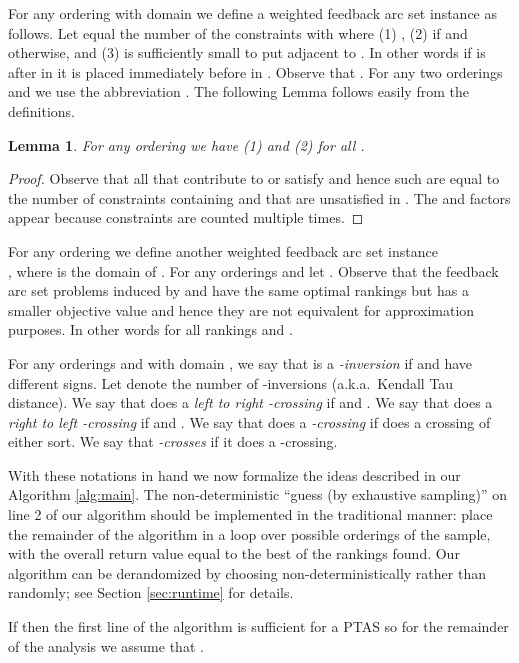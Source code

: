 \documentclass[dvips,11pt,letter]{article}
\newtheorem{lemma}[theorem]{Lemma}
\begin{document}
{For any ordering  with domain  we define a weighted feedback arc set instance  as follows. Let  equal the number of the constraints  with  where (1) , (2)  if  and  otherwise, and (3)  is sufficiently small to put  adjacent to . In other words if  is after  in  it is placed immediately before  in . Observe that . For any two orderings  and  we use the abbreviation .
The following Lemma follows easily from the definitions.

\begin{lemma}\label{lem:objEq}
For any ordering  we have (1)  and (2)  for all .
\end{lemma}

\begin{proof}
Observe that all  that contribute to  or  satisfy  and hence such  are equal to the number of constraints containing  and  that are unsatisfied in . The  and  factors appear because constraints are counted multiple times.
\end{proof}

For any ordering  we define another weighted feedback arc set instance \\
,
 where  is the domain of . For any orderings  and  let . Observe that the feedback arc set problems induced by  and  have the same optimal rankings but  has a smaller objective value and hence they are not equivalent for approximation purposes. In other words  for all rankings  and .

For any orderings  and  with domain , we say that  is a \emph{-inversion} if  and  have different signs. Let  denote the number of -inversions (a.k.a.\ Kendall Tau distance).
We say that  does a \emph{left to right -crossing} if  and . 
We say that  does a \emph{right to left -crossing} if  and . We say that  does a \emph{-crossing} if  does a crossing of either sort.
We say that  \emph{-crosses}  if it does a -crossing.

With these notations in hand we now formalize the ideas described in our Algorithm \ref{alg:main}. The non-deterministic ``guess (by exhaustive sampling)'' on line 2 of our algorithm should be implemented in the traditional manner: place the remainder of the algorithm in a loop over possible orderings of the sample, with the overall return value equal to the best of the  rankings found. Our algorithm can be derandomized by choosing   non-deterministically rather than randomly; see Section \ref{sec:runtime} for details.

If  then the first line of the algorithm is sufficient for a PTAS so for the remainder of the analysis we assume that . 

}
\end{document}

